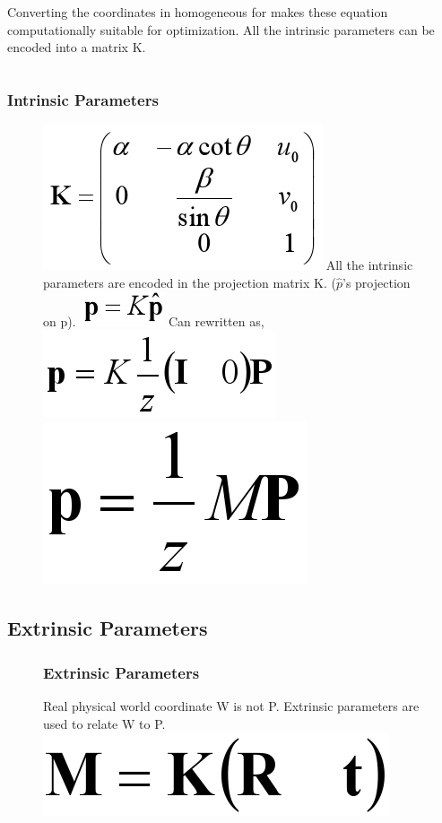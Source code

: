 \documentclass[11pt]{beamer}
\begin{document}
\begin{frame}
\begin{columns}[T] %
\begin{column}{\textwidth}
Converting the coordinates in homogeneous for makes these equation computationally suitable for optimization. All the intrinsic parameters can be encoded into a matrix K.
\end{column}
\end{columns}

\end{frame}


\begin{frame}
\frametitle{Intrinsic Parameters}
\begin{figure}
\centering
\includegraphics[width=.4\textwidth]{k_mat.png}\vfill
All the intrinsic parameters are encoded in the projection matrix K. ($\hat{p}$'s projection on p).\vfill
\includegraphics[width=.15\textwidth]{p_eq_kp_hat.png}\vfill
Can rewritten as,\vfill
\includegraphics[width=.3\textwidth]{p_eq_K_1_2_I_0_P.png}\vfill
\includegraphics[width=.28\textwidth]{p_eq_MP.png}\vfill
\end{figure}
\end{frame}

\subsection{Extrinsic Parameters}
\begin{frame}
\begin{figure}
\centering
\frametitle{Extrinsic Parameters}
Real physical world coordinate W is not P. Extrinsic parameters are used to relate W to P.\vfill
\includegraphics[width=.3\textwidth]{M_eq_KRT.png}\vfill
\end{figure}
\end{frame}
\end{document}
